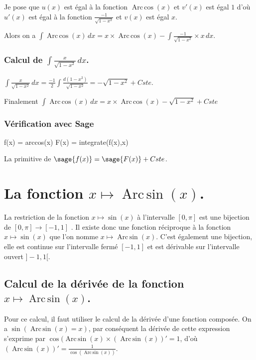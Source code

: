 \documentclass[a4paper,14pt]{extreport} %
\renewcommand{\arcsin}{\mathop{\mathrm{Arc\,sin}}}
\renewcommand{\arccos}{\mathop{\mathrm{Arc\,cos}}}
\begin{document}
Je pose que $u(x)$  est égal à la fonction $\arccos(x)$ et $v'(x)$ est égal $1$  d'où $u'(x)$  est égal à la fonction $ \frac{-1}{\sqrt{1- x^2}} $ et $v(x)$ est égal $x$.

Alors on a $\int \arccos(x) \, dx = x \times \arccos(x) -\int \frac{-1}{\sqrt{1- x^2}} \times x \, dx $.


\subsubsection*{Calcul de $\int \frac{x}{\sqrt{1- x^2}} \, dx $.}

$\int \frac{x}{\sqrt{1- x^2}} \, dx = \frac{-1}{2} \int \frac{d(1-x^2)}{\sqrt{1- x^2}}= -\sqrt{1- x^2} + Cste $.


Finalement $\int \arccos(x) \, dx = x \times \arccos(x) - \sqrt{1- x^2} + Cste $

\subsubsection*{Vérification avec Sage}

\begin{sageblock}
    f(x) = arccos(x)
    F(x) = integrate(f(x),x)
\end{sageblock}

La primitive de $\sage{f(x)} = \sage{F(x)} + Cste $.


\section{La fonction  $x \mapsto \arcsin(x) $.}

La restriction de la fonction $x \mapsto \sin(x) $ à l'intervalle $[0,\pi]$ est une bijection de $[0,\pi] \rightarrow [-1,1]$ . Il existe donc une fonction réciproque à la fonction $x \mapsto \sin(x) $ que l'on nomme $x \mapsto \arcsin(x) $. C'est également une bijection, elle est continue sur l'intervalle fermé  $ [-1,1]$ et est dérivable sur l'intervalle ouvert $]-1,1[$.



\subsection{Calcul de la dérivée de la fonction $x \mapsto \arcsin(x) $.}



Pour ce calcul, il faut utiliser le calcul de la dérivée d'une fonction composée. On a $\sin(\arcsin(x)=x)$, par conséquent la dérivée de cette expression s'exprime par $ \cos(\arcsin(x) \times (\arcsin(x))' = 1$, d'où $(\arcsin(x))' = \frac{1}{\cos(\arcsin(x))} $.
\end{document}
